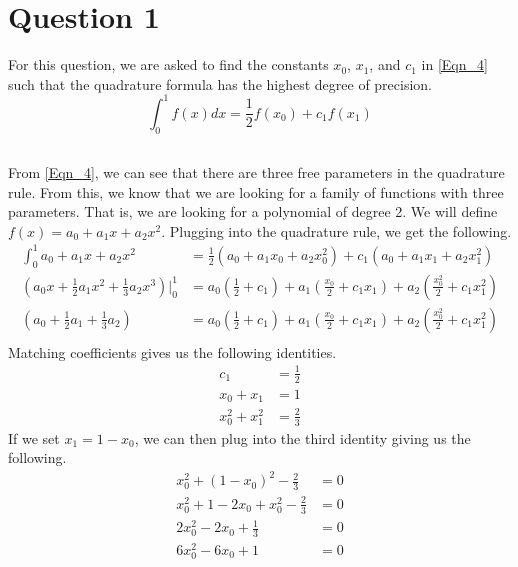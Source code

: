 \documentclass{article}
\begin{document}
\section{Question 1}
For this question, we are asked to find the constants \(x_0\), \(x_1\), and \(c_1\) in \ref{Eqn_4} such that the quadrature formula has the highest degree of precision.
\begin{equation}
    \label{Eqn_4}
    \int_0^1f(x)dx = \frac{1}{2}f(x_0)+c_1f(x_1)
\end{equation}

\subsection{}
From \ref{Eqn_4}, we can see that there are three free parameters in the quadrature rule. From this, we know that we are looking for a family of functions with three parameters. That is, we are looking for a polynomial of degree 2. We will define \(f(x)=a_0+a_1x+a_2x^2\). Plugging into the quadrature rule, we get the following.
\[
\begin{split}
    \int_0^1a_0+a_1x+a_2x^2 &= \frac{1}{2}(a_0+a_1x_0+a_2x_0^2)+c_1(a_0+a_1x_1+a_2x_1^2) \\
    \left(a_0x+\frac{1}{2}a_1x^2+\frac{1}{3}a_2x^3\right)\Bigg|_0^1 &= a_0\left(\frac{1}{2}+c_1\right) + a_1\left(\frac{x_0}{2}+c_1x_1\right) + a_2\left(\frac{x_0^2}{2}+c_1x_1^2\right) \\
    \left(a_0+\frac{1}{2}a_1+\frac{1}{3}a_2\right) &= a_0\left(\frac{1}{2}+c_1\right) + a_1\left(\frac{x_0}{2}+c_1x_1\right) + a_2\left(\frac{x_0^2}{2}+c_1x_1^2\right) \\
\end{split}
\]
Matching coefficients gives us the following identities.
\[
\begin{split}
    c_1 &= \frac{1}{2} \\
    x_0 + x_1 &= 1 \\
    x_0^2 + x_1^2 &= \frac{2}{3}
\end{split}
\]
If we set \(x_1=1-x_0\), we can then plug into the third identity giving us the following.
\[
\begin{split}
    x_0^2 + (1-x_0)^2 - \frac{2}{3} &= 0 \\
    x_0^2 + 1 - 2x_0 + x_0^2 - \frac{2}{3} &= 0 \\
    2x_0^2 - 2x_0 + \frac{1}{3} &= 0 \\
    6x_0^2 - 6x_0 + 1 &= 0 \\
\end{split}
\]
\end{document}
